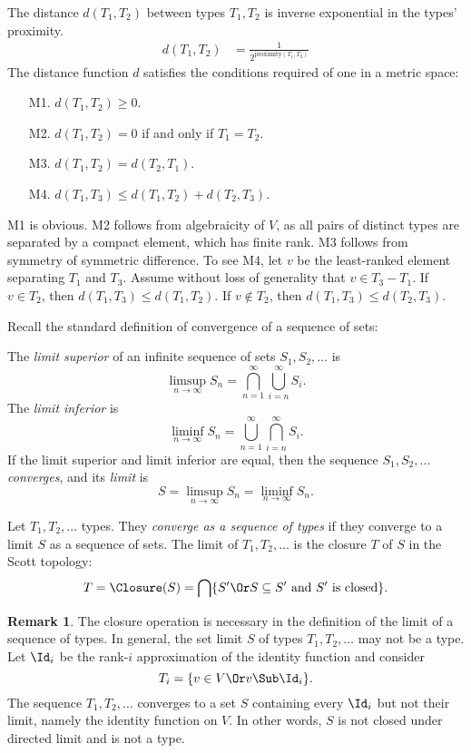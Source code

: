 \documentclass{amsart}
\theoremstyle{definition}
\newtheorem{remark}[subsection]{Remark}
\begin{document}
The distance $d(T_1, T_2)$ between types $T_1, T_2$ is inverse
exponential in the types' proximity.
\begin{align}
\label{distance}
d(T_1,T_2)
&=\frac{1}{2^{\mathrm{proximity}(T_1,T_2)}}
\end{align}
The distance function $d$ satisfies the conditions required of
one in a metric space:
\begin{enumerate}\itemsep=1ex
\item [M1.] $d(T_1,T_2)\ge0$.
\item [M2.] $d(T_1,T_2)=0$ if and only if $T_1=T_2$.
\item [M3.] $d(T_1,T_2)=d(T_2,T_1)$.
\item [M4.] $d(T_1,T_3)\le d(T_1,T_2)+d(T_2,T_3)$.
\end{enumerate}
M1 is obvious. M2 follows from algebraicity of $V$, as all pairs
of distinct types are separated by a compact element, which has
finite rank. M3 follows from symmetry of symmetric difference. To
see M4, let $v$ be the least-ranked element separating $T_1$ and
$T_3$. Assume without loss of generality that $v\in T_3-T_1$. If
$v\in T_2$, then $d(T_1,T_3)\le d(T_1, T_2)$. If $v\notin T_2$,
then $d(T_1, T_3)\le d(T_2, T_3)$.



Recall the standard definition of convergence of a sequence of
sets:

The \emph{limit superior} of an infinite sequence of sets
$S_1,S_2,\ldots$ is
\[
\limsup_{n\rightarrow\infty}S_n =
\bigcap_{n=1}^\infty\bigcup_{i = n}^\infty S_i.
\]
The \emph{limit inferior} is
\[
\liminf_{n\rightarrow\infty}S_n =
\bigcup_{n=1}^\infty\bigcap_{i = n}^\infty S_i.
\]
If the limit superior and limit inferior are equal, then the
sequence $S_1,S_2,\ldots$ \emph{converges}, and its \emph{limit}
is
\[
S = \limsup_{n\rightarrow\infty}S_n = \liminf_{n\rightarrow\infty}S_n.
\]

Let $T_1,T_2,\ldots$ types. They \emph{converge as a sequence of
types} if they converge to a limit $S$ as a sequence of sets. The
limit of $T_1,T_2,\ldots$ is the closure $T$ of $S$ in the Scott
topology:
\[
T=\Closure(S)=\bigcap \{S' \Or S\subseteq S'\text{ and $S'$ is closed}\}.
\]

\begin{remark}
The closure operation is necessary in the definition of the limit
of a sequence of types. In general, the set limit $S$ of types
$T_1,T_2,\ldots$ may not be a type. Let $\Id_i$ be the rank-$i$
approximation of the identity function and consider
\[
T_i=\{v\in V \Or v\Sub\Id_i\}.
\]
The sequence $T_1,T_2,\ldots$ converges to a set $S$ containing
every $\Id_i$ but not their limit, namely the identity function
on $V$. In other words, $S$ is not closed under directed limit
and is not a type.
\end{remark}
\end{document}
